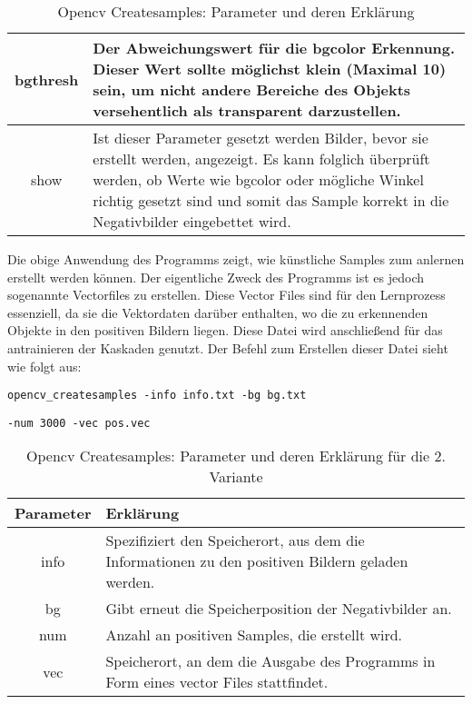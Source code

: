 \begin{table}[H]
\begin{tabularx}{\textwidth}{|c|X|}
\hline
bgthresh &  Der Abweichungswert für die bgcolor Erkennung. Dieser Wert sollte möglichst klein (Maximal 10) sein, um nicht andere Bereiche des Objekts versehentlich als transparent darzustellen.\\ \hline
show & Ist dieser Parameter gesetzt werden Bilder, bevor sie erstellt werden, angezeigt. Es kann folglich überprüft werden, ob Werte wie bgcolor oder mögliche Winkel richtig gesetzt sind und somit das Sample korrekt in die Negativbilder eingebettet wird. \\ \hline
\end{tabularx}
\label{tab:createsamples parameters}
\caption{Opencv Createsamples: Parameter und deren Erklärung}
\end{table}
Die obige Anwendung des Programms zeigt, wie künstliche Samples zum anlernen erstellt werden können. Der eigentliche Zweck des Programms ist es jedoch sogenannte Vectorfiles zu erstellen. Diese Vector Files sind für den Lernprozess essenziell, da sie die Vektordaten  darüber enthalten, wo die zu erkennenden Objekte in den positiven Bildern liegen. Diese Datei wird anschließend für das antrainieren der Kaskaden genutzt. Der Befehl zum Erstellen dieser Datei sieht wie folgt aus:
\begin{lstlisting}
opencv_createsamples -info info.txt -bg bg.txt
\end{lstlisting}
\begin{lstlisting}
-num 3000 -vec pos.vec
\end{lstlisting}
\begin{table}[H]
\begin{tabularx}{\textwidth}{|c|X|}
\hline
Parameter & Erklärung \\ \hline
info & Spezifiziert den Speicherort, aus dem die Informationen zu den positiven Bildern geladen werden.\\ \hline
bg & Gibt erneut die Speicherposition der Negativbilder an.\\ \hline
num & Anzahl an positiven Samples, die erstellt wird.\\ \hline
vec & Speicherort, an dem die Ausgabe des Programms in Form eines vector Files stattfindet.\\ \hline
\end{tabularx}
\label{tab:createsamples parameters2}
\caption{Opencv Createsamples: Parameter und deren Erklärung für die 2. Variante}
\end{table}
\label{sec:opencv_createsamples}